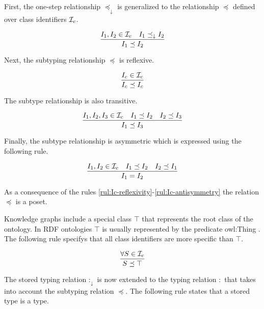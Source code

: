 \documentclass[runningheads]{llncs}
\newcommand{\darr}{\downarrow}
\newcommand{\I}{{\cal I}}
\begin{document}
First, the one-step relationship $\preceq_\darr$ is generalized to the
relationship $\preceq$ defined over class identifiers $\I_c$.

\begin{equation}
\label{rul:Ic-extended}
\dfrac{I_1,I_2\in\I_c \quad I_1\preceq_\darr I_2}
      {I_1 \preceq I_2}
\end{equation}

Next, the subtyping relationship $\preceq$ is reflexive.

\begin{equation}
\label{rul:Ic-reflexivity}
\dfrac{I_c\in \I_c}
      {I_c\preceq\/I_c}
\end{equation}

The subtype relationship is also transitive. 

\begin{equation}
\label{rul:Ic-transitivity}
\dfrac{I_1,I_2,I_3\in\I_c \quad I_1\preceq\/I_2 \quad I_2\preceq\/I_3}
      {I_1\preceq\/I_3}   
\end{equation}

Finally, the subtype relationship is asymmetric which is expressed
using the following rule. 

\begin{equation}
\label{rul:Ic-antisymmetry}
\dfrac{I_1,I_2\in\I_c \quad I_1\preceq\/I_2 \quad I_2\preceq\/I_1}
      {I_1=I_2}   
\end{equation}

As a consequence of the rules
\ref{rul:Ic-reflexivity}-\ref{rul:Ic-antisymmetry} the relation
$\preceq$ is a poset.

Knowledge graphs include a special class $\top$ that represents the
root class of the ontology. In RDF ontologies $\top$ is usually
represented by the predicate owl:Thing \cite{Hoffart2013}. The
following rule specifys that all class identifiers are more specific
than $\top$.

\begin{equation}
\dfrac{\forall\/S\in\I_c}
      {S\preceq\top}
\end{equation}

The stored typing relation $:_\darr$ is now extended to the typing
relation $:$ that takes into account the subtyping relation $\preceq$.
The following rule states that a stored type is a type.
\end{document}
